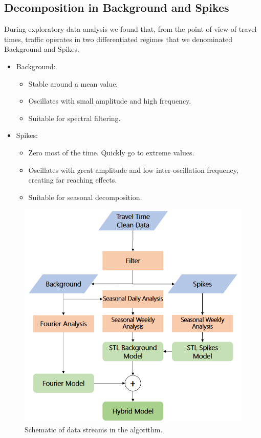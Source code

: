 \documentclass[conference, letterpaper]{IEEEtran}
\begin{document}
\subsection{Decomposition in Background and Spikes}
During exploratory data analysis we found that, from the point of view of travel times, traffic operates in two differentiated regimes that we denominated Background and Spikes. 
\begin{itemize}
	\item Background: 
	\begin{itemize}
		\item Stable around a mean value.
		\item Oscillates with small amplitude and high frequency.
		\item Suitable for spectral filtering.
	\end{itemize}
	\item Spikes: 
	\begin{itemize}
		\item Zero most of the time. Quickly go to extreme values.
		\item Oscillates with great amplitude and low inter-oscillation frequency, creating far reaching effects.
		\item Suitable for seasonal decomposition.
	\end{itemize}
\end{itemize}

\begin{figure}[htbp]
	\centering
	\includegraphics[width=\linewidth]{new_flow.png}
	\caption{Schematic of data streams in the algorithm.}
	\label{fig:flowchart}
\end{figure}
\end{document}
